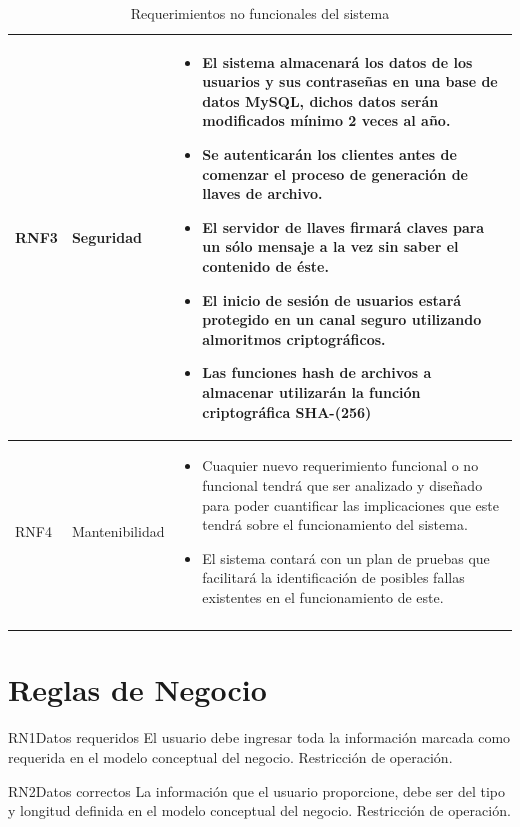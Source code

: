 \begin{longtable}{| p{1.5cm} | p{3cm} | p{11cm} |}
RNF3 & Seguridad & \begin{itemize} 
    \item El sistema almacenará los datos de los usuarios y sus contraseñas en una base de datos MySQL, dichos datos serán modificados mínimo 2  veces al año.  
   \item Se autenticarán los clientes antes de comenzar el proceso de generación de llaves de archivo. 
   \item El servidor de llaves firmará claves para un sólo mensaje a la vez sin saber el contenido de éste. 
   \item El inicio de sesión de usuarios estará protegido en un canal seguro utilizando almoritmos criptográficos. 
   \item Las funciones hash de archivos a almacenar utilizarán la función criptográfica SHA-(256)
 \end{itemize}

\\ \hline 
RNF4 & Mantenibilidad & \begin{itemize}
   \item Cuaquier nuevo requerimiento funcional o no funcional tendrá que ser analizado y diseñado para poder cuantificar las implicaciones que este tendrá sobre el funcionamiento del sistema. 
   \item El sistema contará con un plan de pruebas que facilitará la identificación de posibles fallas existentes en el funcionamiento de este. 
 \end{itemize}
\\ \hline
\caption{Requerimientos no funcionales del sistema}
\label{Servidor de Llaves }
\end{longtable}

\section{Reglas de Negocio}

\begin{BussinesRule}{RN1}{Datos requeridos} 
	\BRitem[Descripción:]  El usuario debe ingresar toda la información marcada como requerida en el modelo conceptual del negocio.
	\BRitem[Tipo:] Restricción de operación.	
\end{BussinesRule}

\begin{BussinesRule}{RN2}{Datos correctos} 
	\BRitem[Descripción:] La información que el usuario proporcione, debe ser del tipo y longitud definida en el modelo conceptual del negocio.
	\BRitem[Tipo:] Restricción de operación.	
\end{BussinesRule}

